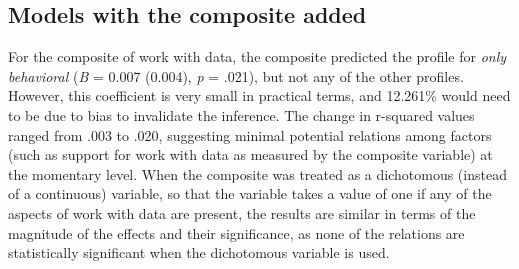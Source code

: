 \documentclass[]{msu-thesis}
\theoremstyle{definition}
\theoremstyle{definition}
\theoremstyle{definition}
\theoremstyle{remark}
\begin{document}
\subsection{Models with the composite
added}\label{models-with-the-composite-added}

For the composite of work with data, the composite predicted the profile
for \emph{only behavioral} (\emph{B} = 0.007 (0.004), \emph{p} = .021),
but not any of the other profiles. However, this coefficient is very
small in practical terms, and 12.261\% would need to be due to bias to
invalidate the inference. The change in r-squared values ranged from
.003 to .020, suggesting minimal potential relations among factors (such
as support for work with data as measured by the composite variable) at
the momentary level. When the composite was treated as a dichotomous
(instead of a continuous) variable, so that the variable takes a value
of one if any of the aspects of work with data are present, the results
are similar in terms of the magnitude of the effects and their
significance, as none of the relations are statistically significant
when the dichotomous variable is used.

\begin{landscape}\begin{table}

\caption{\label{tab:just-composite-red}Results of mixed effects models for the composite}
\centering
{}
\end{table}
\end{landscape}
\end{document}
